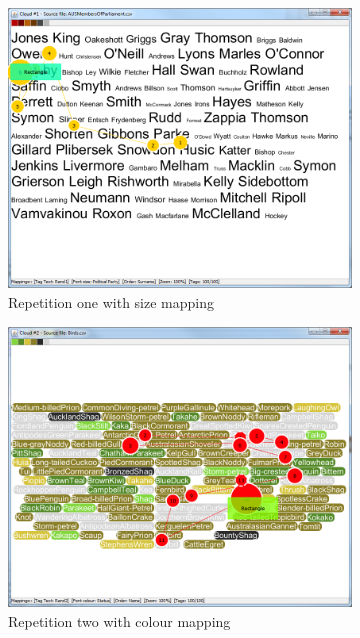 \begin{figure}[!htb]
\centering
\begin{subfigure}{.5\textwidth}
  \centering
  \includegraphics[scale=0.25]{t1featuresearch.png}
  \caption{Repetition one with size mapping}
\end{subfigure}%
\begin{subfigure}{.5\textwidth}
  \centering
  \includegraphics[scale=0.25]{t2featuresearch.png}
  \caption{Repetition two with colour mapping}
\end{subfigure}
\begin{subfigure}{.5\textwidth}

\end{subfigure}
\end{figure}
